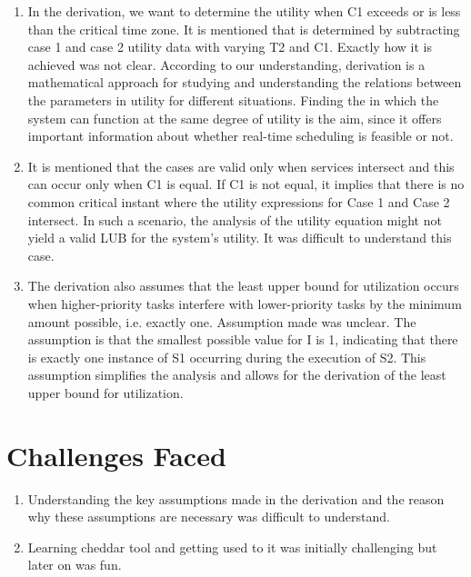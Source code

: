 \documentclass[a4paper,11pt]{article}%
\newenvironment{qanda}{\setlength{\parindent}{0pt}}{\bigskip}
\begin{document}
\begin{qanda}
\begin{enumerate}
\begin{enumerate}
				      \begin{enumerate}
					      \item In the derivation, we want to determine the utility when C1 exceeds or is less than the critical time zone. It is mentioned that is determined by subtracting case 1 and case 2 utility data with varying T2 and C1. Exactly how it is achieved was not clear. According to our understanding, derivation is a mathematical approach for studying and understanding the relations between the parameters in utility for different situations. Finding the in which the system can function at the same degree of utility is the aim, since it offers important information about
					            whether real-time scheduling is feasible or not.
					      \item It is mentioned that the cases are valid only when services intersect and this can occur only when C1 is equal. If C1 is not equal, it implies that there is no common critical instant where the utility expressions for Case 1 and Case 2 intersect. In such a scenario, the analysis of the utility equation might not yield a valid LUB for the system's utility. It was difficult to understand this case.
					      \item The derivation also assumes that the least upper bound for utilization occurs when higher-priority tasks interfere with lower-priority tasks by the minimum amount possible, i.e. exactly one. Assumption made was unclear. The assumption is that the smallest possible value for I is 1, indicating that there is exactly one instance of S1 occurring during the execution of S2. This assumption simplifies the analysis and allows for the derivation of the least upper bound for utilization.
				      \end{enumerate}




			\end{enumerate}


	\end{enumerate}

	\section{Challenges Faced}
	\begin{enumerate}
		\item Understanding the key assumptions made in the derivation and the reason why these assumptions are necessary
		      was difficult to understand.
		\item Learning cheddar tool and getting used to it was initially challenging but later on was fun.
	\end{enumerate}



\end{qanda}
\end{document}
